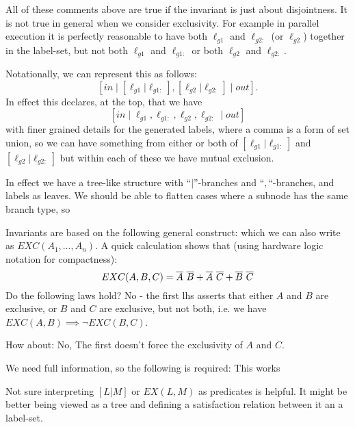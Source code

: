 

All of these comments above are true if the invariant is just about disjointness.
It is not true in general when we consider exclusivity.
For example in parallel execution it is perfectly reasonable to have both
$\ell_{g1}$ and $\ell_{g2:}$ (or $\ell_{g2}$) together in the label-set,
but not both $\ell_{g1}$ and $\ell_{g1:}$
or both $\ell_{g2}$ and $\ell_{g2:}$.

Notationally, we can represent this as follows:
$$
[in \mid [\ell_{g1}|\ell_{g1:}],[\ell_{g2}|\ell_{g2:}] \mid out].
$$
In effect this declares, at the top, that we have
$$
[in \mid \ell_{g1},\ell_{g1:},\ell_{g2},\ell_{g2:} \mid out]
$$
with finer grained details for the generated labels,
where a comma is a form of set union,
so we can have something from
either or both of $[\ell_{g1}|\ell_{g1:}]$ and $[\ell_{g2}|\ell_{g2:}]$
but within each of these we have mutual exclusion.

In effect we have a tree-like structure with ``$|$''-branches
and ``$,$``-branches, and labels as leaves.
We should be able to flatten cases where a subnode has the same branch type,
so



Invariants are based on the following general construct:
which we can also write as $EXC(A_1,\dots,A_n)$.
A quick calculation shows that
(using hardware logic notation for compactness):
\[
 EXC(A,B,C) = \overline{A} ~ \overline{B}  + \overline{A} ~ \overline{C} + \overline{B} ~ \overline{C}
\]
Do the following laws hold?
No - the first lhs asserts that either $A$ and $B$ are exclusive,
or $B$ and $C$ are exclusive, but not both,
i.e. we have $EXC(A,B) \implies \lnot EXC(B,C)$.

How about:
No, The first doesn't force the exclusivity of $A$ and $C$.

We need full information, so the following is required:
This works

Not sure interpreting $[L|M]$ or $EX(L,M)$ as predicates is helpful.
It might be better being viewed as a tree and defining a satisfaction relation
between it an a label-set.


